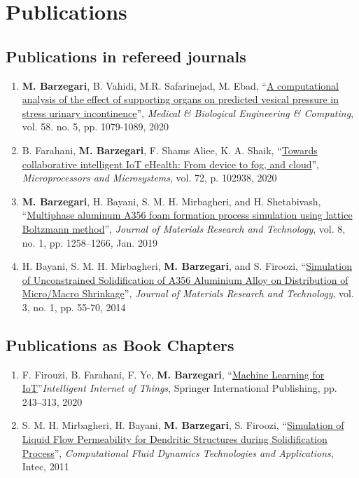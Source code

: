\documentclass{cv}
\begin{document}

\section{Publications}

\subsection{Publications in refereed journals}
\begin{enumerate}
\item
\textbf{M. Barzegari}, B. Vahidi, M.R. Safarinejad, M. Ebad, ``\href{https://doi.org/10.1007/s11517-020-02148-2}{A computational analysis of the effect of supporting organs on predicted vesical pressure in stress urinary incontinence}'', \textit{Medical \& Biological Engineering \& Computing}, vol. 58. no. 5, pp. 1079-1089, 2020
\item
B. Farahani, \textbf{M. Barzegari}, F. Shams Aliee, K. A. Shaik, “\href{https://doi.org/10.1016/j.micpro.2019.102938}{Towards collaborative intelligent IoT eHealth: From device to fog, and cloud}'', \textit{Microprocessors and Microsystems}, vol. 72, p. 102938, 2020
\item
\textbf{M. Barzegari}, H. Bayani, S. M. H. Mirbagheri, and H. Shetabivash, “\href{https://doi.org/10.1016/j.jmrt.2018.03.010}{Multiphase aluminum A356 foam formation process simulation using lattice Boltzmann method}'', \textit{Journal of Materials Research and Technology}, vol. 8, no. 1, pp. 1258–1266, Jan. 2019
\item
H. Bayani, S. M. H. Mirbagheri, \textbf{M. Barzegari}, and S. Firoozi, ``\href{http://www.sciencedirect.com/science/article/pii/S2238785413001129}{Simulation of Unconstrained Solidification of A356 Aluminium Alloy on Distribution of Micro/Macro Shrinkage}'', \textit{Journal of Materials Research and Technology}, vol. 3, no. 1, pp. 55-70, 2014
\end{enumerate}

\subsection{Publications as Book Chapters}

\begin{enumerate}
\item
F. Firouzi, B. Farahani, F. Ye, \textbf{M. Barzegari}, “\href{https://link.springer.com/chapter/10.1007\%2F978-3-030-30367-9_5}{Machine Learning for IoT}''\textit{Intelligent Internet of Things}, Springer International Publishing, pp. 243–313, 2020
\item
S. M. H. Mirbagheri, H. Bayani, \textbf{M. Barzegari}, S. Firoozi, ``\href{https://www.intechopen.com/books/computational-fluid-dynamics-technologies-and-applications/simulation-of-liquid-flow-permeability-for-dendritic-structures-during-solidification-process}{Simulation of Liquid Flow Permeability for Dendritic Structures during Solidification Process}'', \textit{Computational Fluid Dynamics Technologies and Applications}, Intec, 2011
\end{enumerate}
\end{document}
